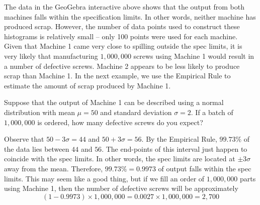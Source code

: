 \documentclass{ximera}
\begin{document}
The data in the GeoGebra interactive above shows that the output from both machines falls within the specification limits.  In other words, neither machine has produced scrap.  However, the number of data points used to construct these histograms is relatively small -- only 100 points were used for each machine.  Given that Machine 1 came very close to spilling outside the spec limits, it is very likely that manufacturing $1,000,000$ screws using Machine 1 would result in a number of defective screws.  Machine 2 appears to be less likely to produce scrap than Machine 1.  In the next example, we use the Empirical Rule to estimate the amount of scrap produced by Machine 1.    

\begin{example}\label{ex:defParts1}
    Suppose that the output of Machine 1 can be described using a normal distribution with mean $\mu=50$ and standard deviation $\sigma=2$.  If a batch of $1,000,000$ is ordered, how many defective screws do you expect?
    \begin{explanation}
        Observe that $50-3\sigma=44$ and $50+3\sigma=56$.  By the Empirical Rule, $99.73\%$ of the data lies between $44$ and $56$.  The end-points of this interval just happen to coincide with the spec limits.  In other words, the spec limits are located at $\pm 3\sigma$ away from the mean.  Therefore, $99.73\%=0.9973$ of output falls within the spec limits.  This may seem like a good thing, but if we fill an order of $1,000,000$ parts using Machine 1, then the number of defective screws will be approximately
        $$(1-0.9973)\times 1,000,000=0.0027\times 1,000,000=2,700$$       
    \end{explanation}
\end{example}
\end{document}
